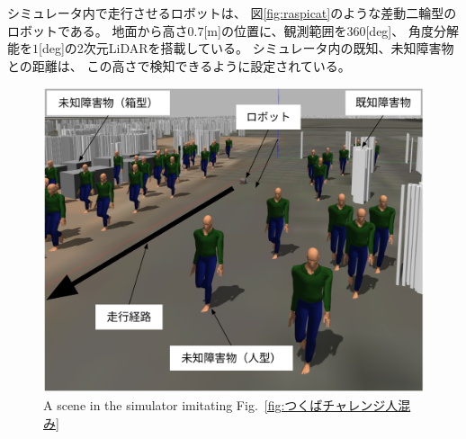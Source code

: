 \documentclass{jarticle}
\begin{document}
シミュレータ内で走行させるロボットは、
図\ref{fig:raspicat}のような差動二輪型のロボットである。
地面から高さ$0.7$[m]の位置に、観測範囲を$360$[deg]、
角度分解能を$1$[deg]の2次元LiDARを搭載している。
シミュレータ内の既知、未知障害物との距離は、
この高さで検知できるように設定されている。




\begin{figure}[htbp]
  \centering
   \includegraphics[width=0.8\linewidth]{fig/hitogomi_gazebo.png}
	\caption{A scene in the simulator imitating Fig.~\ref{fig:つくばチャレンジ人混み}} 
   \label{fig:人混みガゼボ}
\end{figure}
\end{document}
